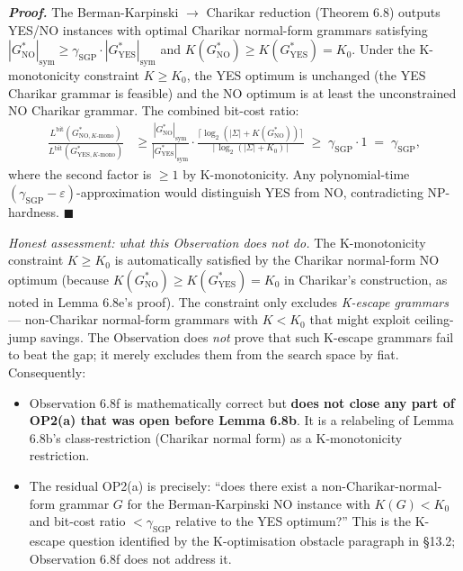 \documentclass[
]{article}
\begin{document}
\emph{\textbf{Proof.}} The Berman-Karpinski $\to$ Charikar reduction
(Theorem 6.8) outputs YES/NO instances with optimal Charikar
normal-form grammars satisfying $|G^*_{\mathrm{NO}}|_{\mathrm{sym}}
\geq \gamma_{\mathrm{SGP}} \cdot |G^*_{\mathrm{YES}}|_{\mathrm{sym}}$
and $K(G^*_{\mathrm{NO}}) \geq K(G^*_{\mathrm{YES}}) = K_0$. Under
the K-monotonicity constraint $K \geq K_0$, the YES optimum is
unchanged (the YES Charikar grammar is feasible) and the NO
optimum is at least the unconstrained NO Charikar grammar. The
combined bit-cost ratio:
\begin{align*}
\frac{L^{\mathrm{bit}}(G^*_{\mathrm{NO}, K\text{-mono}})}{L^{\mathrm{bit}}(G^*_{\mathrm{YES}, K\text{-mono}})}
  &\geq \frac{|G^*_{\mathrm{NO}}|_{\mathrm{sym}}}{|G^*_{\mathrm{YES}}|_{\mathrm{sym}}}
       \cdot \frac{\lceil \log_2(|\Sigma| + K(G^*_{\mathrm{NO}})) \rceil}{\lceil \log_2(|\Sigma| + K_0) \rceil}
  \;\geq\; \gamma_{\mathrm{SGP}} \cdot 1 \;=\; \gamma_{\mathrm{SGP}},
\end{align*}
where the second factor is $\geq 1$ by K-monotonicity. Any
polynomial-time $(\gamma_{\mathrm{SGP}} - \varepsilon)$-approximation
would distinguish YES from NO, contradicting NP-hardness.
\hfill$\blacksquare$

\emph{Honest assessment: what this Observation does \emph{not} do.}
The K-monotonicity constraint $K \geq K_0$ is automatically
satisfied by the Charikar normal-form NO optimum (because
$K(G^*_{\mathrm{NO}}) \geq K(G^*_{\mathrm{YES}}) = K_0$ in
Charikar's construction, as noted in Lemma 6.8e's proof). The
constraint only excludes \emph{K-escape grammars} --- non-Charikar
normal-form grammars with $K < K_0$ that might exploit ceiling-jump
savings. The Observation does \emph{not} prove that such K-escape
grammars fail to beat the gap; it merely excludes them from the
search space by fiat. Consequently:
\begin{itemize}
\item Observation 6.8f is mathematically correct but \textbf{does not
close any part of OP2(a) that was open before Lemma 6.8b}. It
is a relabeling of Lemma 6.8b's class-restriction (Charikar
normal form) as a K-monotonicity restriction.
\item The residual OP2(a) is precisely: ``does there exist a
non-Charikar-normal-form grammar $G$ for the Berman-Karpinski NO
instance with $K(G) < K_0$ and bit-cost ratio $< \gamma_{\mathrm{SGP}}$
relative to the YES optimum?'' This is the K-escape question
identified by the K-optimisation obstacle paragraph in §13.2;
Observation 6.8f does not address it.
\end{itemize}
\end{document}
